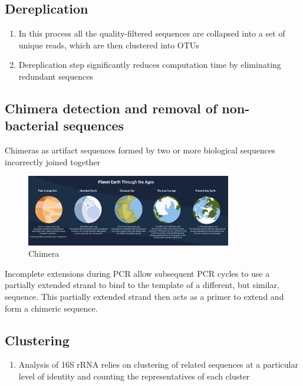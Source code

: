 \documentclass[
]{book}
\providecommand{\tightlist}{%
  \setlength{\itemsep}{0pt}\setlength{\parskip}{0pt}}
\begin{document}
\hypertarget{dereplication}{%
\subsection{Dereplication}\label{dereplication}}

\begin{enumerate}
\def\labelenumi{\arabic{enumi}.}
\tightlist
\item
  In this process all the quality-filtered sequences are collapsed into a set of unique reads, which are then clustered into OTUs
\item
  Dereplication step significantly reduces computation time by eliminating redundant sequences
\end{enumerate}

\hypertarget{chimera-detection-and-removal-of-non-bacterial-sequences}{%
\subsection{Chimera detection and removal of non-bacterial sequences}\label{chimera-detection-and-removal-of-non-bacterial-sequences}}

Chimeras as artifact sequences formed by two or more biological sequences incorrectly joined together

\begin{figure}
\centering
\includegraphics[width=0.8\textwidth,height=\textheight]{./Figures/Planets.png}
\caption{Chimera}
\end{figure}

Incomplete extensions during PCR allow subsequent PCR cycles to use a partially extended strand to bind to the template of a different, but similar, sequence. This partially extended strand then acts as a primer to extend and form a chimeric sequence.

\hypertarget{clustering}{%
\subsection{Clustering}\label{clustering}}

\begin{enumerate}
\def\labelenumi{\arabic{enumi}.}
\tightlist
\item
  Analysis of 16S rRNA relies on clustering of related sequences at a particular level of identity and counting the representatives of each cluster
\end{enumerate}
\end{document}
